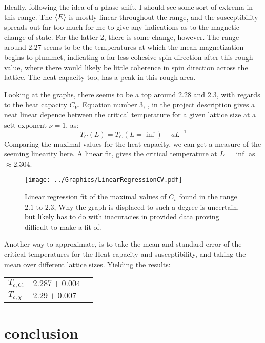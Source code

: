 \documentclass[10pt, twocolumn]{revtex4-1}
\begin{document}
Ideally, following the idea of a phase shift, I should see some sort of extrema in this range. The $\ev{E}$ is mostly linear throughout the range,
and the susceptibility spreads out far too much for me to give any indications as to the magnetic change of state. For the latter 2, there is some change,
however. The range around $2.27$ seems to be the temperatures at which the mean magnetization begins to plummet, indicating a far less cohesive spin direction
after this rough value, where there would likely be little coherence in spin direction across the lattice. The heat capacity too, has a peak in this rough
area.

Looking at the graphs, there seems to be a top around 2.28 and 2.3, with regards to the heat capacity $C_V$. Equation number 3, \cite{Project4}, in the
project description gives a neat linear depence between the critical temperature for a given lattice size at a sett exponent $\nu = 1$, as:
\[ T_C( L ) = T_C ( L = \inf ) + aL^{-1} \]
Comparing the maximal values for the heat capacity, we can get a measure of the seeming linearity here. A linear fit, gives the critical temperature
at $L = \inf$ as $\approx 2.304$.
\begin{figure}[hbtp]
    \texttt{[image: ../Graphics/LinearRegressionCV.pdf]}
    \caption{Linear regression fit of the maximal values of $C_v$ found in the range $2.1$ to $2.3$, Why the graph is displaced to such a degree is
    uncertain, but likely has to do with inacuracies in provided data proving difficult to make a fit of.}
\label{fig:expectml20}
\end{figure}

Another way to approximate, is to take the mean and standard error of the critical temperatures for the Heat capacity and susceptibility, and taking the mean
over different lattice sizes. Yielding the results:
\begin{table}[h]
    \begin{tabular}{ |l|l|l| }
    \hline
        $T_{c,C_v}$ & $2.287 \pm 0.004$ \\
        $T_{c,\chi}$ & $2.29 \pm  0.007$ \\
    \end{tabular}
\end{table}



\section{conclusion}
\end{document}
